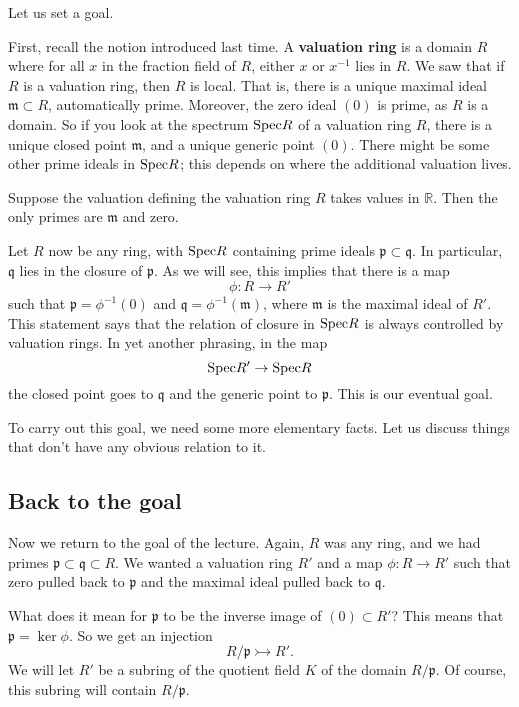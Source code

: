Let us set a goal.


First, recall the notion introduced last time. A \textbf{valuation ring} is a
domain $R$ where for all $x$ in the fraction field of $R$, either $x$ or
$x^{-1}$ lies in $R$. We saw that if $R$ is a valuation ring, then $R$ is
local. That is, there is a unique maximal ideal $\mathfrak{m} \subset R$,
automatically prime.  Moreover, the zero ideal $(0)$ is prime, as $R$ is a
domain. So if you look at the spectrum $\mathrm{Spec} R$ of a valuation ring $R$, there
is a unique closed point $\mathfrak{m}$, and a unique generic point
$(0)$.  There might be some other prime ideals in $\mathrm{Spec} R$; this depends on
where the additional valuation lives.

\begin{example} 
Suppose the valuation defining the valuation ring $R$ takes values in
$\mathbb{R}$. Then the only primes are $\mathfrak{m}$ and zero.
\end{example} 

Let $R$ now be any ring, with $\mathrm{Spec} R$ containing prime ideals
$\mathfrak{p} \subset \mathfrak{q}$.  In particular, $\mathfrak{q}$ lies in
the closure of $\mathfrak{p}$. 
As we will see, this implies that there is a map
\[  \phi: R \to R'  \]
such that $\mathfrak{p} = \phi^{-1}(0)$ and $\mathfrak{q} =
\phi^{-1}(\mathfrak{m})$, where $\mathfrak{m}$ is the maximal ideal of $R'$.
This statement says that the relation of closure in $\mathrm{Spec} R$ is always
controlled by valuation rings.  
In yet another phrasing, in the map
\[ \mathrm{Spec} R' \to \mathrm{Spec} R  \]
the closed point goes to $\mathfrak{q}$ and the generic point to
$\mathfrak{p}$. This is our eventual goal.

To carry out this goal, we need some more elementary facts. Let us discuss
things that don't have any obvious relation to it.

\subsection{Back to the goal} Now we return to the goal of the  lecture. Again, $R$
was any ring, and we had primes $\mathfrak{p} \subset \mathfrak{q} \subset R$. We
wanted a valuation ring $R'$ and a map $\phi: R \to R'$ such that zero pulled
back to $\mathfrak{p}$ and the maximal ideal pulled back to $\mathfrak{q}$.

What does it mean for $\mathfrak{p}$ to be the inverse image of $(0) \subset
R'$? This means that $\mathfrak{p} = \ker \phi$. So we get an injection 
\[ R/\mathfrak{p} \rightarrowtail R'.  \]
We will let $R'$ be a subring of the quotient field $K$ of the domain
$R/\mathfrak{p}$. Of course, this subring will contain $R/\mathfrak{p}$. 

